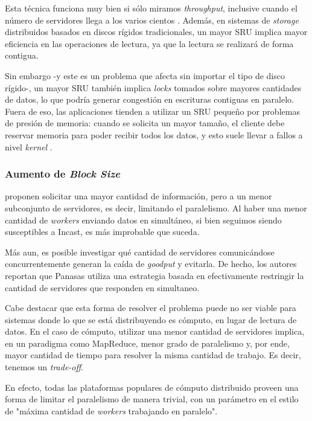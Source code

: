 \documentclass[runningheads,a4paper]{llncs}
\begin{document}
Esta técnica funciona muy bien si sólo miramos \textit{throughput}, inclusive cuando el número de servidores llega a los varios cientos \cite{Ke_SchedulingDataRequests_2012}. Además, en sistemas de \textit{storage} distribuidos basados en discos rígidos tradicionales, un mayor SRU implica mayor eficiencia en las operaciones de lectura, ya que la lectura se realizará de forma contigua. 

Sin embargo -y este es un problema que afecta sin importar el tipo de disco rígido-, un mayor SRU también implica \textit{locks} tomados sobre mayores cantidades de datos, lo que podría generar congestión en escrituras contiguas en paralelo. Fuera de eso, las aplicaciones tienden a utilizar un SRU pequeño por problemas de presión de memoria: cuando se solicita un mayor tamaño, el cliente debe reservar memoria para poder recibir todos los datos, y esto suele llevar a fallos a nivel \textit{kernel} \cite{Kulkarni_Probabilistic_2011}.

\subsubsection{Aumento de \textit{Block Size}}

\citet{Krevat_ApplicationLevelApproaches_2007} proponen solicitar una mayor cantidad de información, pero a un menor subconjunto de servidores, es decir, limitando el paralelismo. Al haber una menor cantidad de \textit{workers} enviando datos en simultáneo, si bien seguimos siendo susceptibles a Incast, es más improbable que suceda.

Más aun, es posible investigar qué cantidad de servidores comunicándose concurrentemente generan la caída de \textit{goodput} y evitarla. De hecho, los autores reportan que Panasas \cite{Nagle_Panasas_2004} utiliza una estrategia basada en efectivamente restringir la cantidad de servidores que responden en simultaneo.

Cabe destacar que esta forma de resolver el problema puede no ser viable para sistemas donde lo que se está distribuyendo es cómputo, en lugar de lectura de datos. En el caso de cómputo, utilizar una menor cantidad de servidores implica, en un paradigma como MapReduce, menor grado de paralelismo y, por ende, mayor cantidad de tiempo para resolver la misma cantidad de trabajo. Es decir, tenemos un \textit{trade-off}.

En efecto, todas las plataformas populares de cómputo distribuido proveen una forma de limitar el paralelismo de manera trivial, con un parámetro en el estilo de "máxima cantidad de \textit{workers} trabajando en paralelo".
\end{document}
